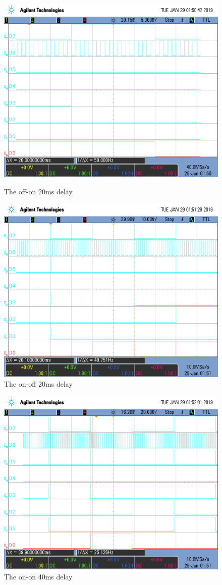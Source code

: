 \documentclass[a4paper, 12pt]{article}
\begin{document}
\begin{figure}[htp]
\centering
\includegraphics[width=.8\textwidth]{0-1.png}
\caption{The off-on 20ms delay}
\includegraphics[width=.8\textwidth]{1-0.png}
\caption{The on-off 20ms delay}
\end{figure}

\begin{figure}[htb]
\centering
\includegraphics[width=.8\textwidth]{1-1.png}
\caption{The on-on 40ms delay}
\end{figure}
\end{document}
